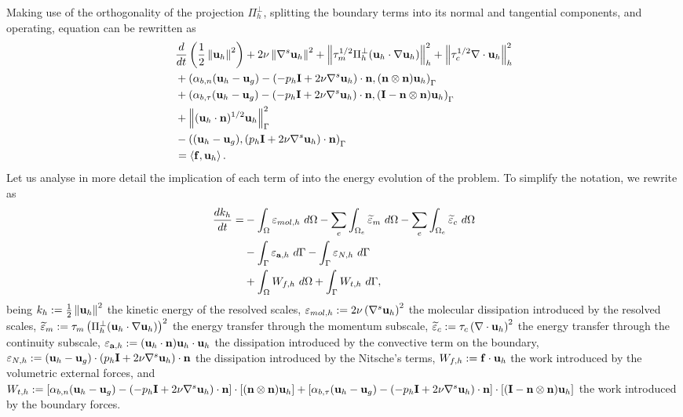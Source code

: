 Making use of the orthogonality of the projection $ \Pi_h^\perp $, splitting the boundary terms into its normal and tangential components, and operating, equation  can be rewritten as
\begin{align}
\label{eq-C7_NS_ene_balance_2}
&\frac{d}{dt}\left(\frac{1}{2}\left\|{\bf u}_h\right\|^2\right)+2\nu\left\|\nabla^s{\bf u}_h\right\|^2+\left\|\tau_m^{1/2}\Pi_h^\perp({\bf u}_h\cdot\nabla{\bf u}_h)\right\|^2_h+\left\|\tau_c^{1/2}\nabla\cdot{\bf u}_h\right\|^2_h\\\nonumber
&+\left(\alpha_{b,n}({\bf u}_h-{\bf u}_g)-(-p_h\mathbf{I}+2\nu\nabla^s{\bf u}_h)\cdot{\bf n},({\bf n}\otimes{\bf n}){\bf u}_h\right)_\Gamma\\\nonumber
&+\left(\alpha_{b,\tau}({\bf u}_h-{\bf u}_g)-(-p_h\mathbf{I}+2\nu\nabla^s{\bf u}_h)\cdot{\bf n},(\mathbf{I}-{\bf n}\otimes{\bf n}){\bf u}_h\right)_\Gamma\\\nonumber
&+\left\|({\bf u}_h\cdot{\bf n})^{1/2}{\bf u}_h\right\|^2_\Gamma\\\nonumber
&-\left(({\bf u}_h-{\bf u}_g),(p_h\mathbf{I}+2\nu\nabla^s{\bf u}_h)\cdot{\bf n}\right)_\Gamma\\\nonumber
&=\left\langle{\bf f},{\bf u}_h\right\rangle.
\end{align}
Let us analyse in more detail the implication of each term of  into the energy evolution of the problem. To simplify the notation, we rewrite  as
\begin{align}
\label{eq-C7_NS_ene_balance_3}
\frac{dk_h}{dt}=&-\int_{\Omega}\varepsilon_{mol,h}\ d\Omega-\sum_e\int_{\Omega_e}\widetilde{\varepsilon}_m\ d\Omega-\sum_e\int_{\Omega_e}\widetilde{\varepsilon}_c\ d\Omega\\\nonumber
&-\int_{\Gamma}\varepsilon_{\a,h}\ d\Gamma-\int_{\Gamma}\varepsilon_{N,h}\ d\Gamma\\\nonumber
&+\int_{\Omega}W_{f,h}\ d\Omega+\int_{\Gamma}W_{t,h}\ d\Gamma,
\end{align}
being $ k_h:=\frac{1}{2}\left\|{\bf u}_h\right\|^2 $ the kinetic energy of the resolved scales, $ \varepsilon_{mol,h}:=2\nu\left(\nabla^s{\bf u}_h\right)^2 $ the molecular dissipation introduced by the resolved scales, $ \widetilde{\varepsilon}_m:=\tau_m\left(\Pi_h^\perp({\bf u}_h\cdot\nabla{\bf u}_h)\right)^2 $ the energy transfer through the momentum subscale, $ \widetilde{\varepsilon}_c:=\tau_c\left(\nabla\cdot{\bf u}_h\right)^2 $ the energy transfer through the continuity subscale, $ \varepsilon_{{\bf a},h}:=({\bf u}_h\cdot{\bf n}){\bf u}_h\cdot{\bf u}_h $ the dissipation introduced by the convective term on the boundary, $ \varepsilon_{N,h}:=({\bf u}_h-{\bf u}_g)\cdot(p_h\mathbf{I}+2\nu\nabla^s{\bf u}_h)\cdot{\bf n} $ the dissipation introduced by the Nitsche's terms, $ W_{f,h}:={\bf f}\cdot{\bf u}_h $ the work introduced by the volumetric external forces, and $ W_{t,h}:=\left[\alpha_{b,n}({\bf u}_h-{\bf u}_g)-(-p_h\mathbf{I}+2\nu\nabla^s{\bf u}_h)\cdot{\bf n}\right]\cdot\left[({\bf n}\otimes{\bf n}){\bf u}_h\right]+\left[\alpha_{b,\tau}({\bf u}_h-{\bf u}_g)-(-p_h\mathbf{I}+2\nu\nabla^s{\bf u}_h)\cdot{\bf n}\right]\cdot\left[(\mathbf{I}-{\bf n}\otimes{\bf n}){\bf u}_h\right] $ the work introduced by the boundary forces.

